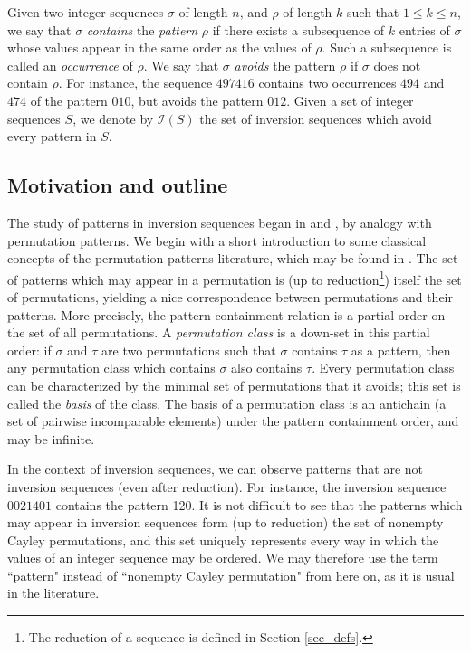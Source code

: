 \documentclass[a4paper,11pt]{article}
\theoremstyle{definition}
\theoremstyle{remark}
\newcommand{\I}{\mathcal{I}}
\begin{document}
Given two integer sequences $\sigma$ of length $n$, and $\rho$ of length $k$ such that $1 \leq k \leq n$, we say that $\sigma$ \emph{contains} the \emph{pattern} $\rho$ if there exists a subsequence of $k$ entries of $\sigma$ whose values appear in the same order as the values of $\rho$. Such a subsequence is called an \emph{occurrence} of $\rho$. We say that $\sigma$ \emph{avoids} the pattern $\rho$ if $\sigma$ does not contain $\rho$. For instance, the sequence $497416$ contains two occurrences $494$ and $474$ of the pattern $010$, but avoids the pattern $012$. Given a set of integer sequences $S$, we denote by $\I(S)$ the set of inversion sequences which avoid every pattern in $S$.

\subsection{Motivation and outline}

The study of patterns in inversion sequences began in \cite{Mansour_Shattuck_2015} and \cite{Corteel_Martinez_Savage_Weselcouch_2016}, by analogy with permutation patterns. We begin with a short introduction to some classical concepts of the permutation patterns literature, which may be found in \cite{Bevan_2015}. The set of patterns which may appear in a permutation is (up to reduction\footnote{The reduction of a sequence is defined in Section \ref{sec_defs}.}) itself the set of permutations, yielding a nice correspondence between permutations and their patterns. More precisely, the pattern containment relation is a partial order on the set of all permutations. A \emph{permutation class} is a down-set in this partial order: if $\sigma$ and $\tau$ are two permutations such that $\sigma$ contains $\tau$ as a pattern, then any permutation class which contains $\sigma$ also contains $\tau$. Every permutation class can be characterized by the minimal set of permutations that it avoids; this set is called the \emph{basis} of the class. The basis of a permutation class is an antichain (a set of pairwise incomparable elements) under the pattern containment order, and may be infinite.

In the context of inversion sequences, we can observe patterns that are not inversion sequences (even after reduction). For instance, the inversion sequence $0021401$ contains the pattern 120. It is not difficult to see that the patterns which may appear in inversion sequences form (up to reduction) the set of nonempty Cayley permutations, and this set uniquely represents every way in which the values of an integer sequence may be ordered.
We may therefore use the term ``pattern" instead of ``nonempty Cayley permutation" from here on, as it is usual in the literature.
\end{document}
